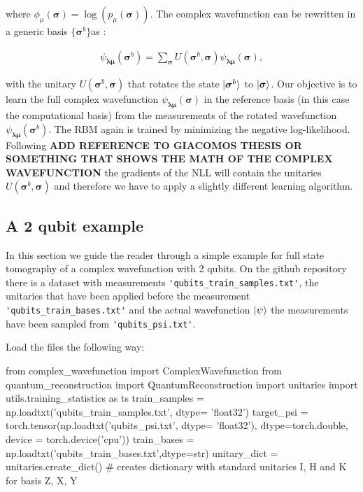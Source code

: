 \documentclass[submission, Phys]{SciPost}
\begin{document}
where $\phi_{\mu}(\bm{\sigma}) = \log (p_{\mu} (\bm{\sigma}))$. The complex wavefunction can be rewritten in a generic basis $\{ \bm{\sigma}^b \}$as :

\begin{align}
\psi_{\bm{\lambda} \bm{\mu}} (\bm{\sigma}^b)= \sum_{\bm{\sigma}} U (\bm{\sigma}^b, \bm{\sigma}) \psi_{\bm{\lambda} \bm{\mu}} (\bm{\sigma}),
\end{align}

with the unitary $U (\bm{\sigma}^b, \bm{\sigma})$ that rotates the state $\ket{\bm{\sigma}^b}$ to $\ket{\bm{\sigma}}$. Our objective is to learn the full complex wavefunction $\psi_{\bm{\lambda} \bm{\mu}} (\bm{\sigma})$ in the reference basis (in this case the computational basis) from the measurements of the rotated wavefunction $\psi_{\bm{\lambda} \bm{\mu}} (\bm{\sigma}^b)$.
The RBM again is trained by minimizing the negative log-likelihood. Following \cite{} \textbf{ADD REFERENCE TO GIACOMOS THESIS OR SOMETHING THAT SHOWS THE MATH OF THE COMPLEX WAVEFUNCTION} the gradients of the NLL will contain the unitaries $U (\bm{\sigma}^b, \bm{\sigma})$ and therefore we have to apply a slightly different learning algorithm.

\subsection{A 2 qubit example}

In this section we guide the reader through a simple example for full state tomography of a complex wavefunction with 2 qubits. On the github repository there is a dataset with measurements \verb|'qubits_train_samples.txt'|, the unitaries that have been applied before the measurement \verb|'qubits_train_bases.txt'| and the actual wavefunction $\ket{\psi}$ the measurements have been sampled from \verb|'qubits_psi.txt'|.

Load the files the following way:

\begin{python}
from complex_wavefunction import ComplexWavefunction
from quantum_reconstruction import QuantumReconstruction
import unitaries
import utils.training_statistics as ts
train_samples = np.loadtxt('qubits_train_samples.txt', dtype= 'float32')
target_psi  = torch.tensor(np.loadtxt('qubits_psi.txt', dtype= 'float32'), dtype=torch.double, device = torch.device('cpu'))
train_bases = np.loadtxt('qubits_train_bases.txt',dtype=str)
unitary_dict = unitaries.create_dict() # creates dictionary with standard unitaries I, H and K for basis Z, X, Y
\end{python}
\end{document}
